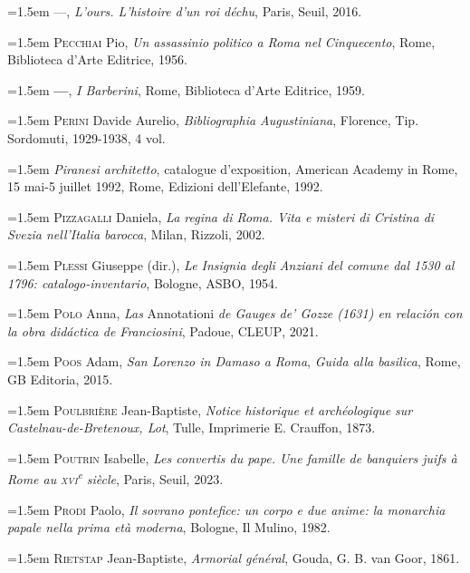 \documentclass[12pt,twoside,openany]{book}
\newenvironment{PurhBibliography}
  {%
    \par
    \setlength{\parindent}{0pt}%
    \setlength{\leftskip}{0pt}%
  }
  {%
    \par
  }
\begin{document}
\begin{PurhBibliography}
\noindent\hangindent=1.5em —, \textit{L’ours. L’histoire d’un roi déchu}, Paris, Seuil, 2016.\par
\noindent\hangindent=1.5em \textsc{Pecchiai} Pio, \textit{Un assassinio politico a Roma nel Cinquecento}, Rome, Biblioteca d’Arte Editrice, 1956.\par
\noindent\hangindent=1.5em \textbf{—}, \textit{I Barberini}, Rome, Biblioteca d’Arte Editrice, 1959.\par
\noindent\hangindent=1.5em \textsc{Perini} Davide Aurelio, \textit{Bibliographia Augustiniana}, Florence, Tip. Sordomuti, 1929-1938, 4 vol.\par
\noindent\hangindent=1.5em \textit{Piranesi architetto}, catalogue d’exposition, American Academy in Rome, 15 mai-5 juillet 1992, Rome, Edizioni dell’Elefante, 1992.\par
\noindent\hangindent=1.5em \textsc{Pizzagalli} Daniela, \textit{La regina di Roma. Vita e misteri di Cristina di Svezia nell’Italia barocca}, Milan, Rizzoli, 2002.\par
\noindent\hangindent=1.5em \textsc{Plessi} Giuseppe (dir.), \textit{Le Insignia degli Anziani del comune dal 1530 al 1796: catalogo-inventario}, Bologne, ASBO, 1954.\par
\noindent\hangindent=1.5em \textsc{Polo} Anna, \textit{Las }Annotationi \textit{de Gauges de’ Gozze (1631) en relación con la obra didáctica de Franciosini}, Padoue, \textsc{CLEUP}, 2021.\par
\noindent\hangindent=1.5em \textsc{Poos} Adam, \textit{San Lorenzo in Damaso a Roma}, \textit{Guida alla basilica}, Rome, \textsc{GB} Editoria, 2015.\par
\noindent\hangindent=1.5em \textsc{Poulbrière} Jean-Baptiste, \textit{Notice historique et archéologique sur Castelnau-de-Bretenoux, Lot}, Tulle, Imprimerie E. Crauffon, 1873.\par
\noindent\hangindent=1.5em \textsc{Poutrin} Isabelle, \textit{Les convertis du pape. Une famille de banquiers juifs à Rome au }\textit{\textsc{xvi}}\textit{\textsuperscript{e}}\textit{ siècle}, Paris, Seuil, 2023.\par
\noindent\hangindent=1.5em \textsc{Prodi} Paolo, \textit{Il sovrano pontefice: un corpo e due anime: la monarchia papale nella prima età moderna}, Bologne, Il Mulino, 1982.\par
\noindent\hangindent=1.5em \textsc{Rietstap} Jean-Baptiste, \textit{Armorial général}, Gouda, G. B. van Goor, 1861.\par

\end{PurhBibliography}
\end{document}
